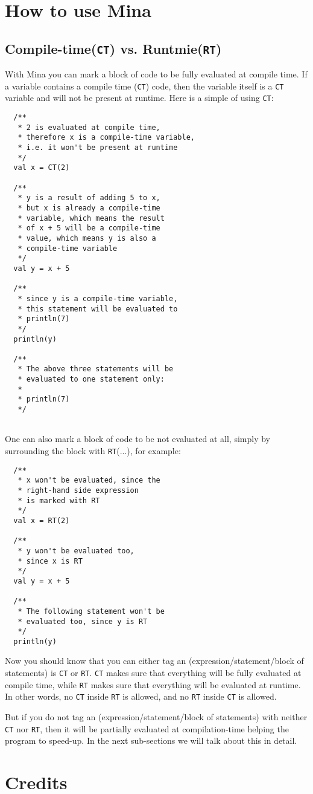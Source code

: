 \documentclass[10pt, a4paper]{article}
\newcommand{\CT}{\texttt{CT}\xspace}
\newcommand{\RT}{\texttt{RT}\xspace}
\begin{document}
\section{How to use Mina}

\subsection{Compile-time(\CT) vs. Runtmie(\RT)}
With Mina you can mark a block of code to be fully evaluated at compile time.
If a variable contains a compile time (\CT) code, then the variable itself is a
\CT variable and will not be present at runtime. Here is a simple of using \CT:

\begin{lstlisting}
  /**
   * 2 is evaluated at compile time,
   * therefore x is a compile-time variable,
   * i.e. it won't be present at runtime
   */
  val x = CT(2)    
  
  /**
   * y is a result of adding 5 to x,
   * but x is already a compile-time
   * variable, which means the result
   * of x + 5 will be a compile-time
   * value, which means y is also a
   * compile-time variable
   */              
  val y = x + 5    
  
  /**
   * since y is a compile-time variable,
   * this statement will be evaluated to 
   * println(7)
   */  
  println(y)
  
  /**
   * The above three statements will be 
   * evaluated to one statement only:
   * 
   * println(7)
   */
  
\end{lstlisting}

One can also mark a block of code to be not evaluated at all, simply by surrounding the block with \RT(...), for example:

\begin{lstlisting}
  /**
   * x won't be evaluated, since the 
   * right-hand side expression
   * is marked with RT
   */
  val x = RT(2)
  
  /**
   * y won't be evaluated too, 
   * since x is RT
   */
  val y = x + 5       
  
  /**
   * The following statement won't be 
   * evaluated too, since y is RT
   */
  println(y)
\end{lstlisting}

Now you should know that you can either tag an (expression/statement/block of
statements) is \CT or \RT. \CT makes sure that everything will be fully
evaluated at compile time, while \RT makes sure that everything will be
evaluated at runtime. In other words, no \CT inside \RT is allowed, and no \RT
inside \CT is allowed.



But if you do not tag an (expression/statement/block of statements) with
neither \CT nor \RT, then it will be partially evaluated at compilation-time
helping the program to speed-up. In the next sub-sections we will talk about
this in detail.


\section{Credits}
\end{document}
